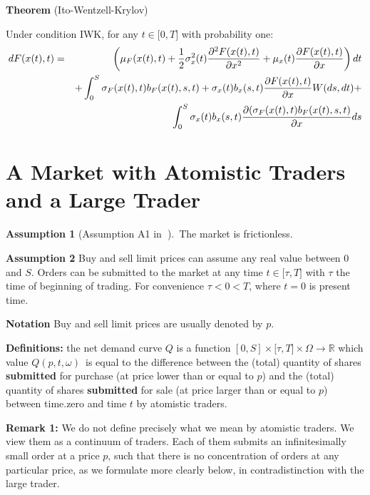 \documentclass{article}
\begin{document}
\textbf{Theorem} (Ito-Wentzell-Krylov)

Under condition IWK, for any $t\in \lbrack 0,T]$ with probability one:%
\begin{eqnarray}
dF(x(t),t) &=&\left( \mu _{F}(x(t),t)+\frac{1}{2}\sigma _{x}^{2}(t)\frac{%
\partial ^{2}F(x(t),t)}{\partial x^{2}}+\mu _{x}(t)\frac{\partial F(x(t),t)}{%
\partial x}\right) dt  \label{ItoWentzell} \\
&&+\int_{0}^{S}\sigma _{F}(x(t),t)b_{F}(x(t),s,t)+\sigma _{x}(t)b_{x}(s,t)%
\frac{\partial F(x(t),t)}{\partial x}W(ds,dt)+  \notag \\
&&\int_{0}^{S}\sigma _{x}(t)b_{x}(s,t)\frac{\partial (\sigma
_{F}(x(t),t)b_{F}(x(t),s,t)}{\partial x}ds  \notag
\end{eqnarray}

\section{A Market with Atomistic Traders and a Large Trader}

\textbf{Assumption 1 }(Assumption A1 in\textbf{\ }\cite{Jar92}).\ The market
is frictionless.

\bigskip

\textbf{Assumption 2 }Buy and sell limit prices can assume any real value
between $0$ and $S$. Orders can be submitted to the market at any time $t\in 
\mathbb{[\tau },T]$ with $\tau $ the time of beginning of trading. For
convenience $\tau <0<T$, where $t=0$ is present time.

\bigskip

\textbf{Notation} Buy and sell limit prices are usually denoted by $p$.

\bigskip

\textbf{Definitions: }the net demand curve $Q$ is a function $[0,S]\times 
\mathbb{[\tau },T]\times \Omega \mathbb{\rightarrow R}$ which value $%
Q(p,t,\omega )$\ is equal to the difference between the (total) quantity of
shares \textbf{submitted} for purchase (at price lower than or equal to $p$)
and the (total) quantity of shares \textbf{submitted} for sale (at price
larger than or equal to $p$) between time.zero and time $t$ by atomistic
traders.

\bigskip

\textbf{Remark 1: }We do not define precisely what we mean by atomistic
traders. We view them as a continuum of traders. Each of them submits an
infinitesimally small order at a price $p$, such that there is no
concentration of orders at any particular price, as we formulate more
clearly below, in contradistinction with the large trader.
\end{document}
